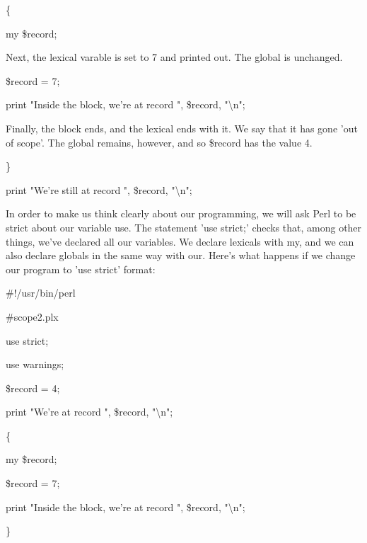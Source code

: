 \documentclass[a4paper,11pt]{book}
\begin{document}
\noindent 

\noindent 

\noindent \{

\noindent my \$record;

\noindent 

\noindent Next, the lexical varable is set to 7 and printed out. The global is unchanged.

\noindent 

\noindent 

\noindent \$record = 7;

\noindent print "Inside the block, we're at record ", \$record, "\textbackslash n";

\noindent 

\noindent Finally, the block ends, and the lexical ends with it. We say that it has gone 'out of scope'. The global remains, however, and so \$record has the value 4.

\noindent 

\noindent \}

\noindent 

\noindent print "We're still at record ", \$record, "\textbackslash n";

\noindent 

\noindent In order to make us think clearly about our programming, we will ask Perl to be strict about our variable use. The statement 'use strict;' checks that, among other things, we've declared all our variables. We declare lexicals with my, and we can also declare globals in the same way with our. Here's what happens if we change our program to 'use strict' format:

\noindent 

\noindent \#!/usr/bin/perl

\noindent \#scope2.plx

\noindent use strict;

\noindent use warnings;

\noindent \$record = 4;

\noindent print "We're at record ", \$record, "\textbackslash n";

\noindent 

\noindent \{

\noindent my \$record;

\noindent \$record = 7;

\noindent print "Inside the block, we're at record ", \$record, "\textbackslash n";

\noindent \}

\noindent 
\end{document}
